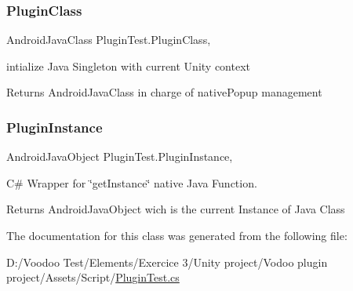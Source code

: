 \subsubsection{\texorpdfstring{Plugin\+Class}{PluginClass}}
{\footnotesize\ttfamily Android\+Java\+Class Plugin\+Test.\+Plugin\+Class\hspace{0.3cm}{\ttfamily [static]}, {\ttfamily [get]}}



intialize Java Singleton with current Unity context 

\begin{DoxyReturn}{Returns}
Android\+Java\+Class in charge of native\+Popup management 
\end{DoxyReturn}
\mbox{\label{class_plugin_test_adff2a11b1757e5e5bdf992942fe66daa}} 
\subsubsection{\texorpdfstring{Plugin\+Instance}{PluginInstance}}
{\footnotesize\ttfamily Android\+Java\+Object Plugin\+Test.\+Plugin\+Instance\hspace{0.3cm}{\ttfamily [static]}, {\ttfamily [get]}}



C\# Wrapper for \char`\"{}get\+Instance\char`\"{} native Java Function. 

\begin{DoxyReturn}{Returns}
Android\+Java\+Object wich is the current Instance of Java Class 
\end{DoxyReturn}


The documentation for this class was generated from the following file\+:\begin{DoxyCompactItemize}
\item 
D\+:/\+Voodoo Test/\+Elements/\+Exercice 3/\+Unity project/\+Vodoo plugin project/\+Assets/\+Script/\mbox{\hyperlink{_plugin_test_8cs}{Plugin\+Test.\+cs}}\end{DoxyCompactItemize}
